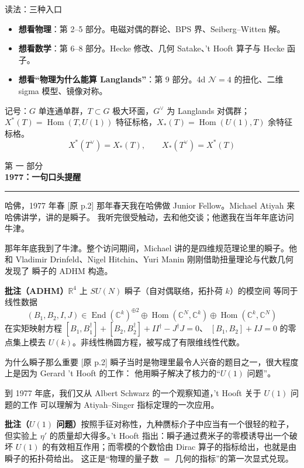 \documentclass[aspectratio=169,12pt]{ctexbeamer}
\newcommand{\CC}{\mathbb{C}}
\newcommand{\RR}{\mathbb{R}}
\newcommand{\cN}{\mathcal{N}}
\newcommand{\gvee}{G^{\vee}}
\newcommand{\Tvee}{T^{\vee}}
\newcommand{\Hom}{\operatorname{Hom}}
\newcommand{\End}{\operatorname{End}}
\newcommand{\srcp}[1]{{\color{black!40}\scriptsize[原 p.#1]}}
\newcommand{\partframe}[2]{%
\begin{frame}[plain]
  \vspace*{2.6cm}
  {\color{black!35}\large 第 #1 部分}\\[0.8em]
  {\LARGE\bfseries #2}\\[1.2em]
  {\color{black!40}\rule{2.2cm}{0.4pt}}
\end{frame}}
\begin{document}
\begin{frame}{读法：三种入口}
  \begin{itemize}
    \item \textbf{想看物理}：第 2--5 部分。电磁对偶的群论、BPS 界、Seiberg--Witten 解。
    \item \textbf{想看数学}：第 6--8 部分。Hecke 修改、几何 Satake、't Hooft 算子与 Hecke 函子。
    \item \textbf{想看“物理为什么能算 Langlands”}：第 9 部分。4d $\cN=4$ 的扭化、二维 sigma 模型、镜像对称。
  \end{itemize}
  \vspace{0.5em}
  记号：$G$ 单连通单群，$T\subset G$ 极大环面，$\gvee$ 为 Langlands 对偶群；
  $X^*(T)=\Hom(T,U(1))$ 特征标格，$X_*(T)=\Hom(U(1),T)$ 余特征标格。
  \[
    \boxed{\;X^*(\Tvee)=X_*(T),\qquad X_*(\Tvee)=X^*(T)\;}
  \]
\end{frame}

\partframe{一}{1977：一句口头提醒}

\begin{frame}{哈佛，1977 年春}
  \srcp{2} 那年春天我在哈佛做 Junior Fellow。Michael Atiyah 来哈佛讲学，讲的是瞬子。
  我听完很受触动，去和他交谈；他邀我在当年年底访问牛津。
  \vspace{0.4em}

  那年年底我到了牛津。整个访问期间，Michael 讲的是四维规范理论里的瞬子。他和
  Vladimir Drinfeld、Nigel Hitchin、Yuri Manin 刚刚借助扭量理论与代数几何发现了
  瞬子的 ADHM 构造。
  \begin{beizhu}
  \textbf{批注（ADHM）}\quad $\RR^4$ 上 $SU(N)$ 瞬子（自对偶联络，拓扑荷 $k$）的模空间
  等同于线性数据
  \[
    (B_1,B_2,I,J)\in\End(\CC^k)^{\oplus2}\oplus\Hom(\CC^N,\CC^k)\oplus\Hom(\CC^k,\CC^N)
  \]
  在实矩映射方程 $[B_1,B_1^\dagger]+[B_2,B_2^\dagger]+II^\dagger-J^\dagger J=0$、
  $[B_1,B_2]+IJ=0$ 的零点集上模去 $U(k)$。非线性椭圆方程，被写成了有限维线性代数。
  \end{beizhu}
\end{frame}

\begin{frame}{为什么瞬子那么重要}
  \srcp{2} 瞬子当时是物理里最令人兴奋的题目之一，很大程度上是因为 Gerard 't Hooft 的工作：
  他用瞬子解决了核力的“$U(1)$ 问题”。
  \vspace{0.4em}

  到 1977 年底，我们又从 Albert Schwarz 的一个观察知道，'t Hooft 关于 $U(1)$ 问题的工作
  可以理解为 Atiyah--Singer 指标定理的一次应用。
  \begin{beizhu}
  \textbf{批注（$U(1)$ 问题）}\quad 按照手征对称性，九种赝标介子中应当有一个很轻的粒子，
  但实验上 $\eta'$ 的质量却大得多。't Hooft 指出：瞬子通过费米子的零模诱导出一个破坏
  $U(1)$ 的有效相互作用；而零模的个数恰由 Dirac 算子的指标给出，也就是由瞬子的拓扑荷给出。
  这正是“物理的量子数 $=$ 几何的指标”的第一次显式兑现。
  \end{beizhu}
\end{frame}
\end{document}

